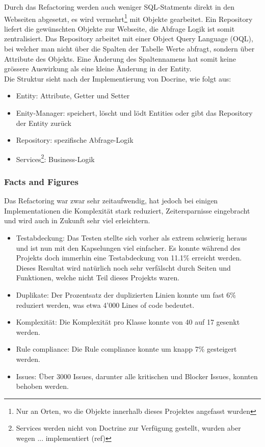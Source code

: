 \FloatBarrier
Durch das Refactoring werden auch weniger SQL-Statments direkt in den Webseiten abgesetzt, es wird vermehrt\footnote{Nur an Orten, wo die Objekte innerhalb dieses Projektes angefasst wurden} mit Objekte gearbeitet. Ein Repository liefert die gewünschten Objekte zur Webseite, die Abfrage Logik ist somit zentralisiert. Das Repository arbeitet mit einer Object Query Language (OQL), bei welcher man nicht über die Spalten der Tabelle Werte abfragt, sondern über Attribute des Objekts. Eine Änderung des Spaltennamens hat somit keine grössere Auswirkung als eine kleine Änderung in der Entity.\\

Die Struktur sieht nach der Implementierung von Docrine, wie folgt aus:
\begin{itemize}
\item Entity: Attribute, Getter und Setter
\item Enity-Manager: speichert, löscht und lödt Entities oder gibt das Repository der Entity zurück
\item Repository: spezifische Abfrage-Logik
\item Services\footnote{Services werden nicht von Doctrine zur Verfügung gestellt, wurden aber wegen ... implementiert (ref)}: Business-Logik
\end{itemize}

\newpage
\subsubsection{Facts and Figures}
Das Refactoring war zwar sehr zeitaufwendig, hat jedoch bei einigen Implementationen die Komplexität stark reduziert, Zeitersparnisse eingebracht und wird auch in Zukunft sehr viel erleichtern.
\begin{itemize}
\item Testabdeckung: Das Testen stellte sich vorher als extrem schwierig heraus und ist nun mit den Kapselungen viel einfacher. Es konnte während des Projekts doch immerhin eine Testabdeckung von 11.1\% erreicht werden. Dieses Resultat wird natürlich noch sehr verfälscht durch Seiten und Funktionen, welche nicht Teil dieses Projekts waren.
\item Duplikate: Der Prozentsatz der duplizierten Linien konnte um fast 6\% reduziert werden, was etwa 4'000 Lines of code bedeutet.
\item Komplexität: Die Komplexität pro Klasse konnte von 40 auf 17 gesenkt werden.
\item Rule compliance: Die Rule compliance konnte um knapp 7\% gesteigert werden.
\item Issues: Über 3000 Issues, darunter alle kritischen und Blocker Issues, konnten behoben werden.
\end{itemize}


